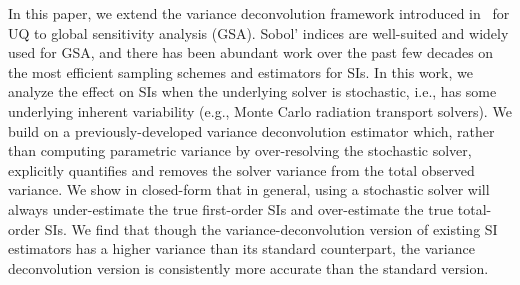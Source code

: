 In this paper, we extend the variance deconvolution framework introduced in~\cite{clements-etal-2024} for UQ to global sensitivity analysis (GSA).
Sobol' indices are well-suited and widely used for GSA, and there has been abundant work over the past few decades on the most efficient sampling schemes and estimators for SIs. 
In this work, we analyze the effect on SIs when the underlying solver is stochastic, i.e., has some underlying inherent variability (e.g., Monte Carlo radiation transport solvers).
We build on a previously-developed variance deconvolution estimator which, rather than computing parametric variance by over-resolving the stochastic solver, explicitly quantifies and removes the solver variance from the total observed variance.
We show in closed-form that in general, using a stochastic solver will always under-estimate the true first-order SIs and over-estimate the true total-order SIs. 
We find that though the variance-deconvolution version of existing SI estimators has a higher variance than its standard counterpart, the variance deconvolution version is consistently more accurate than the standard version.